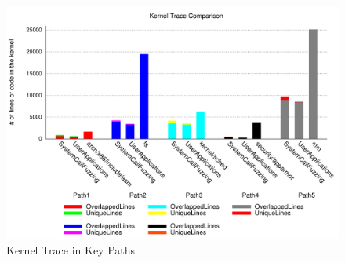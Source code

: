\begin{figure}[h]
\centering
\includegraphics[width=1.0\columnwidth]{diagram/lind_ccs15_diagram_02.pdf}
\caption{Kernel Trace in Key Paths}
\label{fig:key_paths_trace}
\end{figure}

